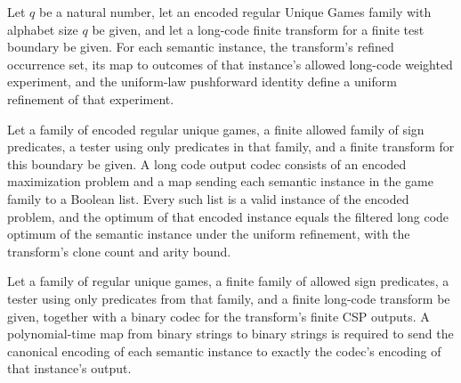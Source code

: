 \begin{definition}
\label{FABL.EncodedRegularUniqueGamesFamily.LongCodeFiniteTransform.uniformRefinement}
\leanok
{}
Let $q$ be a natural number, let an encoded regular Unique Games family with alphabet
size $q$ be given, and let a long-code finite transform for a finite test boundary be
given. For each semantic instance, the transform's refined occurrence set, its map to
outcomes of that instance's allowed long-code weighted experiment, and the uniform-law
pushforward identity define a uniform refinement of that experiment.
\end{definition}

\begin{definition}
\label{FABL.EncodedRegularUniqueGamesFamily.LongCodeOutputCodec}
\leanok
{}
Let a family of encoded regular unique games, a finite allowed family of sign
predicates, a tester using only predicates in that family, and a finite transform for
this boundary be given. A long code output codec consists of an encoded maximization
problem and a map sending each semantic instance in the game family to a Boolean list.
Every such list is a valid instance of the encoded problem, and the optimum of that
encoded instance equals the filtered long code optimum of the semantic instance under
the uniform refinement, with the transform's clone count and arity bound.
\end{definition}

\begin{definition}
\label{FABL.EncodedRegularUniqueGamesFamily.LongCodeTransformMachine}
\leanok
{}
Let a family of regular unique games, a finite family of allowed sign predicates, a
tester using only predicates from that family, and a finite long-code transform be
given, together with a binary codec for the transform’s finite CSP outputs. A
polynomial-time map from binary strings to binary strings is required to send the
canonical encoding of each semantic instance to exactly the codec’s encoding of that
instance’s output.
\end{definition}

